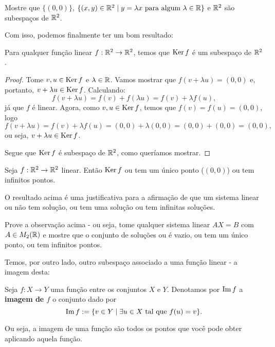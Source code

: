 \begin{exerc}
	Mostre que $\{(0,0)\}$, $\{(x,y)\in \mathbb R^2\mid y=\lambda x \mbox{ para algum }\lambda\in \mathbb R\}$ e $\mathbb R^2$ são subespaços de $\mathbb R^2$.
\end{exerc}

Com isso, podemos finalmente ter um bom resultado:

\begin{prop}
	Para qualquer função linear $f:\mathbb R^2\to\mathbb R^2$, temos que $\operatorname{Ker} f$ é um subespaço de $\mathbb R^2$.
\end{prop}

\begin{proof}
	Tome $v,u\in \operatorname{Ker} f$ e $\lambda\in \mathbb R$. Vamos mostrar que $f(v+\lambda u)=(0,0)$ e, portanto, $v+\lambda u\in \operatorname{Ker} f$. Calculando:
	\[f(v+\lambda u)=f(v)+f(\lambda u)=f(v)+\lambda f(u),\]já que $f$ é linear. Agora, como $v,u\in \operatorname{Ker} f$, temos que $f(v)=f(u)=(0,0)$, logo
	\[f(v+\lambda u)=f(v)+\lambda f(u)=(0,0)+\lambda (0,0)=(0,0)+(0,0)=(0,0),\]ou seja, $v+\lambda u\in \operatorname{Ker} f$. 
	
	Segue que $\operatorname{Ker} f$ é subespaço de $\mathbb R^2$, como queríamos mostrar.
\end{proof}
\begin{cor}
	Seja $f:\mathbb R^2\to\mathbb R^2$ linear. Então $\operatorname{Ker} f$ ou tem um único ponto ($(0,0)$) ou tem infinitos pontos. 
\end{cor}

\begin{rmk}
	O resultado acima é uma justificativa para a afirmação de que um sistema linear ou não tem solução, ou tem uma solução ou tem infinitas soluções.
\end{rmk}

\begin{exerc}
	Prove a observação acima - ou seja, tome qualquer sistema linear $AX=B$ com $A\in M_2(\mathbb R)$ e mostre que o conjunto de soluções ou é vazio, ou tem um único ponto, ou tem infinitos pontos.
\end{exerc}

Temos, por outro lado, outro subespaço associado a uma função linear - a imagem desta:

\begin{df}
	Seja $f:X\to Y$ uma função entre os conjuntos $X$ e $Y$. Denotamos por $\operatorname{Im} f$ a \textbf{imagem de $f$} o conjunto dado por 
	\[\operatorname{Im} f:=\{v\in Y\mid \exists u\in X\mbox{ tal que }f(u)=v\}.\]
\end{df}

Ou seja, a imagem de uma função são todos os pontos que você pode obter aplicando aquela função.

